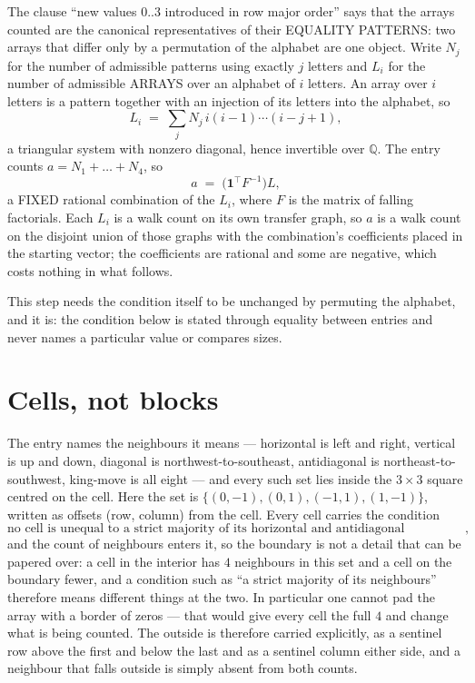 \documentclass[11pt,a4paper]{article}
\theoremstyle{plain}
\theoremstyle{definition}
\begin{document}
The clause ``new values $0..3$ introduced in row major order'' says that the arrays
counted are the canonical representatives of their EQUALITY PATTERNS: two arrays that differ
only by a permutation of the alphabet are one object. Write $N_j$ for the number of admissible
patterns using exactly $j$ letters and $L_i$ for the number of admissible ARRAYS over an
alphabet of $i$ letters. An array over $i$ letters is a pattern together with an injection of
its letters into the alphabet, so
\[
L_i\;=\;\sum_{j}N_j\,i(i-1)\cdots(i-j+1),
\]
a triangular system with nonzero diagonal, hence invertible over $\mathbb{Q}$. The entry
counts $a=N_1+\dots+N_{4}$, so
\[
a\;=\;\bigl(\mathbf{1}^{\!\top}F^{-1}\bigr)L ,
\]
a FIXED rational combination of the $L_i$, where $F$ is the matrix of falling factorials.
Each $L_i$ is a walk count on its own transfer graph, so $a$ is a walk count on the disjoint
union of those graphs with the combination's coefficients placed in the starting vector; the
coefficients are rational and some are negative, which costs nothing in what follows.

This step needs the condition itself to be unchanged by permuting the alphabet, and it is:
the condition below is stated through equality between entries and never names a particular
value or compares sizes.

\section{Cells, not blocks}

The entry names the neighbours it means --- horizontal is left and right, vertical is up and
down, diagonal is northwest-to-southeast, antidiagonal is northeast-to-southwest, king-move is
all eight --- and every such set lies inside the $3\times3$ square centred on the cell. Here
the set is $\{(0,-1), (0,1), (-1,1), (1,-1)\}$, written as offsets (row, column) from the cell. Every cell carries
the condition
\[
\text{no cell is unequal to a strict majority of its horizontal and antidiagonal neighbours},
\]
and the count of neighbours enters it, so the boundary is not a detail that can be papered
over: a cell in the interior has $4$ neighbours in this set and a cell on the boundary
fewer, and a condition such as ``a strict majority of its neighbours'' therefore means
different things at the two. In particular one cannot pad the array with a border of zeros ---
that would give every cell the full $4$ and change what is being counted. The outside is
therefore carried
explicitly, as a sentinel row above the first and below the last and as a sentinel column
either side, and a neighbour that falls outside is simply absent from both counts.
\end{document}

